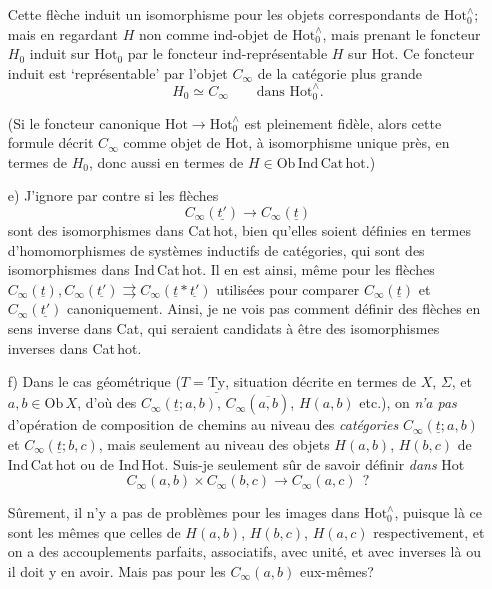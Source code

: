 \documentclass[11pt]{article}
\newcommand{\printedpage}[1]{\marginpar{\footnotesize p.~#1}}
\newcommand{\msp}[1]{\marginpar{\footnotesize [#1]}}
\newcommand{\Hotz}{\mathrm{Hot}^{\wedge}_{0}}
\newcommand{\Hot}{\mathrm{Hot}}
\begin{document}
\begin{enumerate}
Cette flèche induit un isomorphisme pour les objets correspondants de $\Hotz$; mais en regardant $H$ non comme ind-objet de $\Hotz$, mais prenant le foncteur $H_0$ induit sur $\Hot_0$ par le foncteur ind-représentable $H$ sur Hot. Ce foncteur induit est ‘représentable’ par l'objet $C_\infty$ de la catégorie plus grande
\[
H_0 \simeq C_\infty \qquad \text{dans } \Hotz.
\]

(Si le foncteur canonique $\Hot \longrightarrow \Hotz$ est pleinement fidèle, alors cette formule décrit $C_\infty$ comme objet de Hot, à isomorphisme unique près, en termes de $H_0$, donc aussi en termes de $H \in \mathrm{Ob\,Ind\,Cat\,hot}$.)

\printedpage{78}
\msp{page 124}
\item[e)] J'ignore par contre si les flèches
\[
C_\infty(\underline{t'}) \longrightarrow C_\infty(\underline{t})
\]
sont des isomorphismes dans Cat\,hot, bien qu'elles soient définies en termes d'homomorphismes de systèmes inductifs de catégories, qui sont des isomorphismes dans Ind\,Cat\,hot. Il en est ainsi, même pour les flèches $C_\infty(\underline{t}), C_\infty(\underline{t'}) \rightrightarrows C_\infty(\underline{t} * \underline{t'})$ utilisées pour comparer $C_\infty(\underline{t})$ et $C_\infty(\underline{t'})$ canoniquement. Ainsi, je ne vois pas comment définir des flèches en sens inverse dans Cat, qui seraient candidats à être des isomorphismes inverses dans Cat\,hot.

\item[f)] Dans le cas géométrique ($T = \underline{\mathrm{Ty}}$, situation décrite en termes de $X$, $\Sigma$, et $a, b \in \mathrm{Ob}\,X$, d'où des $C_\infty(\underline{t}; a, b)$, $C_\infty(\overline{a, b})$, $H(a,b)$ etc.), on \textit{n'a pas} d'opération de composition de chemins au niveau des \textit{catégories} $C_\infty(\underline{t}; a, b)$ et $C_\infty(\underline{t}; b, c)$, mais seulement au niveau des objets $H(a,b)$, $H(b,c)$ de Ind\,Cat\,hot ou de Ind\,Hot. Suis-je seulement sûr de savoir définir \textit{dans} Hot
\[
C_\infty(a,b) \times C_\infty(b,c) \longrightarrow C_\infty(a,c) \ \ ?
\]

Sûrement, il n'y a pas de problèmes pour les images dans $\Hotz$, puisque là ce sont les mêmes que celles de $H(a,b)$, $H(b,c)$, $H(a,c)$ respectivement, et on a des accouplements parfaits, associatifs, avec unité, et avec inverses là ou il doit y %
\msp{page 125}
en avoir. Mais pas pour les $C_\infty(a,b)$ eux-mêmes?
\end{enumerate}
\end{document}
